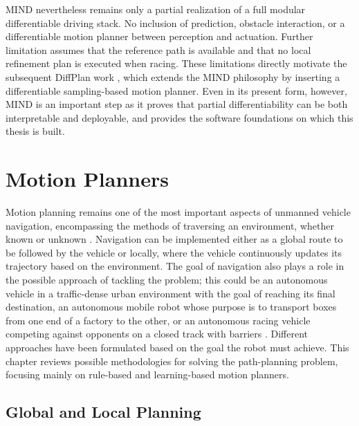 MIND nevertheless remains only a partial realization of a full modular differentiable driving stack.
No inclusion of prediction, obstacle interaction, or a differentiable motion planner between perception and actuation.
Further limitation assumes that the reference path is available and that no local refinement plan is executed when racing.
These limitations directly motivate the subsequent DiffPlan work \cite{swadiryus_DifferentiableMotionPlanning_2025, koch_DifferentiableInterpretablePath_2025}, which extends the MIND philosophy by inserting a differentiable sampling-based motion planner.
Even in its present form, however, MIND is an important step as it proves that partial differentiability can be both interpretable and deployable, and provides the software foundations on which this thesis is built.

\chapter{Motion Planners}
\label{chapter:MotionPlanners}

Motion planning remains one of the most important aspects of unmanned vehicle navigation, encompassing the methods of traversing an environment, whether known or unknown \cite{schwarting_PlanningDecisionMaking_2018, gonzalez_ReviewMotionPlanning_2016}.
Navigation can be implemented either as a global route to be followed by the vehicle or locally, where the vehicle continuously updates its trajectory based on the environment.
The goal of navigation also plays a role in the possible approach of tackling the problem; this could be an autonomous vehicle in a traffic-dense urban environment with the goal of reaching its final destination,
an autonomous mobile robot whose purpose is to transport boxes from one end of a factory to the other, or an autonomous racing vehicle competing against opponents on a closed track with barriers \cite{betz_TUMAutonomousMotorsport_2023}.
Different approaches have been formulated based on the goal the robot must achieve.
This chapter reviews possible methodologies for solving the path-planning problem, focusing mainly on rule-based and learning-based motion planners.

\section{Global and Local Planning}
\label{section:GlobalvsLocal}

